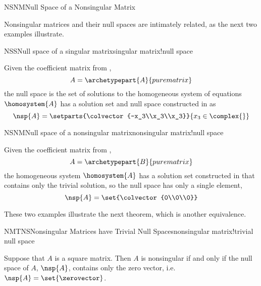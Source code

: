 %
\begin{subsect}{NSNM}{Null Space of a Nonsingular Matrix}
%
\begin{para}Nonsingular matrices and their null spaces are intimately related, as the next two examples illustrate.\end{para}
%
\begin{example}{NSS}{Null space of a singular matrix}{singular matrix!null space}
\begin{para}Given the coefficient matrix from ,
\begin{equation*}
A=\archetypepart{A}{purematrix}\end{equation*}
the null space is the set of solutions to the homogeneous system of equations  $\homosystem{A}$ has a solution set and null space constructed in  as
\begin{equation*}
\nsp{A}=\setparts{\colvector{-x_3\\x_3\\x_3}}{x_3\in\complex{\null}}
\end{equation*}\end{para}
\end{example}
%
\begin{example}{NSNM}{Null space of a nonsingular matrix}{nonsingular matrix!null space}
\begin{para}Given the coefficient matrix from ,
\begin{equation*}
A=\archetypepart{B}{purematrix}\end{equation*}
the homogeneous system $\homosystem{A}$ has a solution set constructed in  that contains only the trivial solution, so the null space has only a single element,
\begin{equation*}
\nsp{A}=\set{\colvector{0\\0\\0}}
\end{equation*}\end{para}
\end{example}
%
\begin{para}These two examples illustrate the next theorem, which is another equivalence.\end{para}
%
\begin{theorem}{NMTNS}{Nonsingular Matrices have Trivial Null Spaces}{nonsingular matrix!trivial null space}
\begin{para}Suppose that $A$ is a square matrix.  Then $A$ is nonsingular if and only if the null space of $A$, $\nsp{A}$, contains only the zero vector, i.e.\ $\nsp{A}=\set{\zerovector}$.\end{para}

\end{theorem}
\end{subsect}
